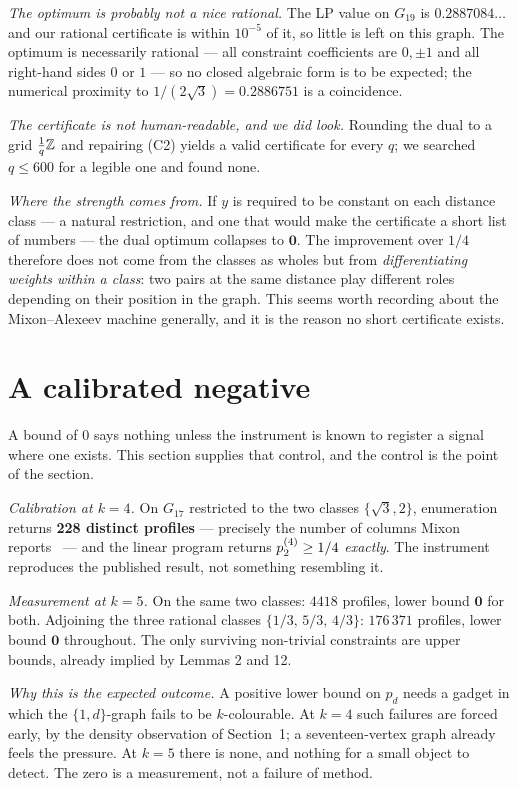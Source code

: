 \emph{The optimum is probably not a nice rational.} The LP value on $G_{19}$ is
$0.2887084\ldots$ and our rational certificate is within $10^{-5}$ of it, so
little is left on this graph. The optimum is necessarily rational --- all
constraint coefficients are $0,\pm1$ and all right-hand sides $0$ or $1$ --- so
no closed algebraic form is to be expected; the numerical proximity to
$1/(2\sqrt3)=0.2886751$ is a coincidence.

\emph{The certificate is not human-readable, and we did look.} Rounding the dual
to a grid $\tfrac1q\mathbb{Z}$ and repairing (C2) yields a valid certificate for every
$q$; we searched $q\le600$ for a legible one and found none.

\emph{Where the strength comes from.} If $y$ is required to be constant on each
distance class --- a natural restriction, and one that would make the
certificate a short list of numbers --- the dual optimum collapses to $\mathbf0$.
The improvement over $1/4$ therefore does not come from the classes as wholes
but from \emph{differentiating weights within a class}: two pairs at the same
distance play different roles depending on their position in the graph. This
seems worth recording about the Mixon--Alexeev machine generally, and it is the
reason no short certificate exists.

\section{A calibrated negative}
\label{sec:calibrated}


A bound of $0$ says nothing unless the instrument is known to register a signal
where one exists. This section supplies that control, and the control is the
point of the section.

\emph{Calibration at $k=4$.} On $G_{17}$ restricted to the two classes
$\{\sqrt3,2\}$, enumeration returns \textbf{228 distinct profiles} --- precisely
the number of columns Mixon reports~\cite{Polymath16} --- and the linear program returns
$p^{(4)}_{2}\ge1/4$ \emph{exactly}. The instrument reproduces the published
result, not something resembling it.

\emph{Measurement at $k=5$.} On the same two classes: $4418$ profiles, lower
bound $\mathbf0$ for both. Adjoining the three rational classes
$\{1/3,\,5/3,\,4/3\}$: $176\,371$ profiles, lower bound $\mathbf0$ throughout.
The only surviving non-trivial constraints are upper bounds, already implied by
Lemmas 2 and 12.

\emph{Why this is the expected outcome.} A positive lower bound on $p_d$ needs a
gadget in which the $\{1,d\}$-graph fails to be $k$-colourable. At $k=4$ such
failures are forced early, by the density observation of Section~1; a seventeen-vertex graph
already feels the pressure. At $k=5$ there is none, and nothing for a small
object to detect. The zero is a measurement, not a failure of method.

